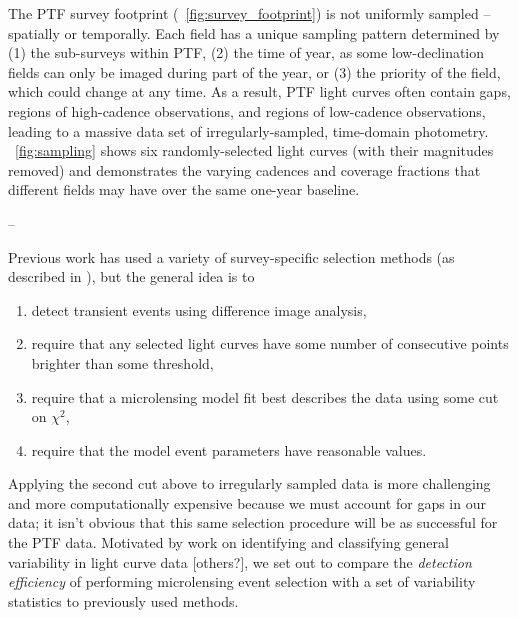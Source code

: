 \documentclass[12pt,preprint]{aastex}
\begin{document}
The PTF survey footprint (\figurename~\ref{fig:survey_footprint}) is not uniformly sampled -- spatially or temporally. Each field has a unique sampling pattern determined by (1) the sub-surveys within PTF, (2) the time of year, as some low-declination fields can only be imaged during part of the year, or (3) the priority of the field, which could  change at any time. As a result, PTF light curves often contain gaps, regions of high-cadence observations, and regions of low-cadence observations, leading to a massive data set of irregularly-sampled, time-domain photometry. \figurename~\ref{fig:sampling} shows six randomly-selected light curves (with their magnitudes removed) and demonstrates the varying cadences and coverage fractions that different fields may have over the same one-year baseline.

--

Previous work has used a variety of survey-specific selection methods (as described in \citealt{alcock2000, wyrzykowski2009, hamadache2009, sumi2011}), but the general idea is to \begin{enumerate}
	\item detect transient events using difference image analysis, 
	\item require that any selected light curves have some number of consecutive points brighter than some threshold,
	\item require that a microlensing model fit best describes the data using some cut on $\chi^2$,
	\item require that the model event parameters have reasonable values.
\end{enumerate}
Applying the second cut above to irregularly sampled data is more challenging and more computationally expensive because we must account for gaps in our data; it isn't obvious that this same selection procedure will be as successful for the PTF data. Motivated by work on identifying and classifying general variability in light curve data \citep{shin2009}[others?], we set out to compare the \textit{detection efficiency} of performing microlensing event selection with a set of variability statistics to previously used methods.
\end{document}
